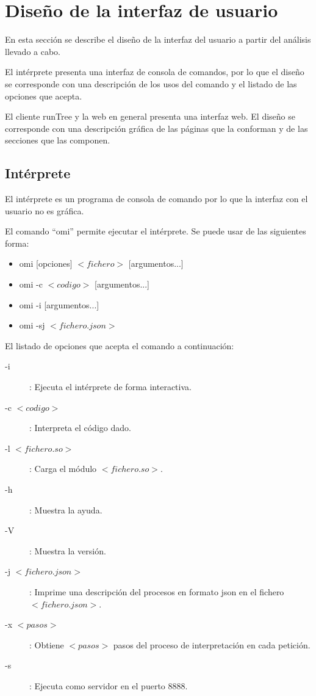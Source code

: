 \section{Diseño de la interfaz de usuario}
En esta sección se describe el diseño de la interfaz del usuario a partir del análisis llevado a cabo.

El intérprete presenta una interfaz de consola de comandos, por lo que el diseño se corresponde con una descripción de los usos 
del comando y el listado de las opciones que acepta.

El cliente runTree y la web en general presenta una interfaz web. El diseño se corresponde con una descripción 
gráfica de las páginas que la conforman y de las secciones que las componen.
\subsection{Intérprete}
El intérprete es un programa de consola de comando por lo que la interfaz con el usuario no es gráfica.

El comando ``omi'' permite ejecutar el intérprete. Se puede usar de las siguientes forma:
\begin{itemize}
   \item omi [opciones] $<fichero>$ [argumentos...]
   \item omi -c $<codigo>$ [argumentos...]
   \item omi -i [argumentos...]
   \item omi -sj $<fichero.json>$
\end{itemize}

El listado de opciones que acepta el comando a continuación:

\begin{description}
\item[-i	]:	Ejecuta el intérprete de forma interactiva.
 \item [-c $<codigo>$]:	Interpreta el código dado.
 \item [-l $<fichero.so>$]: Carga el módulo $<fichero.so>$.
\item [-h]: Muestra la ayuda.
 \item[-V]: Muestra la versión.
\item [-j $<fichero.json>$]: Imprime una descripción del procesos en formato json en el fichero $<fichero.json>$.
  \item [-x $<pasos>$]: Obtiene $<pasos>$ pasos del proceso de interpretación en cada petición. 
 \item [-s]:	Ejecuta como servidor en el puerto 8888.
\end {description}

